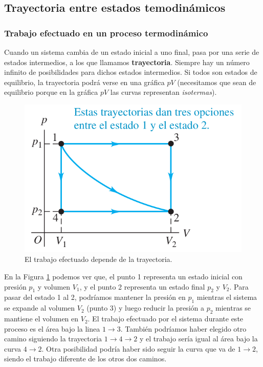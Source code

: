 \documentclass[12pt]{article}
\begin{document}
  \vspace{0.2cm}

  \subsection{Trayectoria entre estados temodinámicos}
  \subsubsection{Trabajo efectuado en un proceso termodinámico}
  Cuando un sistema cambia de un estado inicial a uno final, pasa por una serie de estados intermedios, a los que llamamos \textbf{trayectoria}. Siempre hay un número infinito de posibilidades para dichos estados intermedios. Si todos son estados de equilibrio, la trayectoria podrá verse en una gráfica $ pV $ (necesitamos que sean de equilibrio porque en la gráfica $ pV $ las curvas representan \textit{isotermas}).

  \begin{figure}[H]
    \centering
    \includegraphics[width=0.5\linewidth]{imagenes/trabajo-trayectoria.png}
    \caption{El trabajo efectuado depende de la trayectoria.}
    \label{fig:trabajo-trayectoria}
  \end{figure}
  
  En la Figura \ref{fig:trabajo-trayectoria} podemos ver que, el punto 1 representa un estado inicial con presión $ p_{1} $ y volumen $ V_{1} $, y el punto 2 representa un estado final $ p_{2} $ y $ V_{2} $. Para pasar del estado 1 al 2, podríamos mantener la presión en $ p_{1} $ mientras el sistema se expande al volumen $ V_{2} $ (punto 3) y luego reducir la presión a $ p_{2} $ mientras se mantiene el volumen en $ V_{2} $. El trabajo efectuado por el sistema durante este proceso es el área bajo la linea $ 1 \to 3 $. También podríamos haber elegido otro camino siguiendo la trayectoria $ 1 \to 4 \to 2 $ y el trabajo sería igual al área bajo la curva $ 4 \to 2 $. Otra posibilidad podría haber sido seguir la curva que va de $ 1 \to 2 $, siendo el trabajo diferente de los otros dos caminos.
\end{document}
